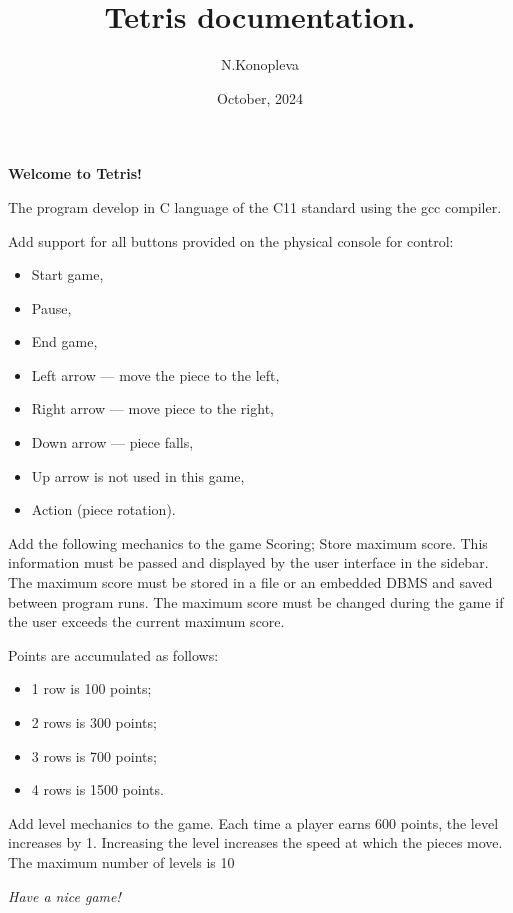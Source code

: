 \documentclass[12pt, letterpaper]{article}
\title{Tetris documentation.}
\author{N.Konopleva}
\date{October, 2024}
\begin{document}
\maketitle

\textbf{Welcome to Tetris!}

The program develop in C language of the C11 standard using the gcc compiler.


Add support for all buttons provided on the physical console for control: 
\begin{itemize}
    \item Start game,
    \item Pause,
    \item End game,
    \item Left arrow — move the piece to the left,
    \item Right arrow — move piece to the right,
    \item Down arrow — piece falls,
    \item Up arrow is not used in this game,
    \item Action (piece rotation).
\end{itemize}


Add the following mechanics to the game 
Scoring;
Store maximum score. 
This information must be passed and displayed by the user interface in the sidebar. The maximum score must be stored in a file or an embedded
DBMS and saved between program runs. 
The maximum score must be changed during the game if the user exceeds the current maximum score. 

Points are accumulated as follows: 

\begin{itemize}
    \item  1 row is 100 points;
    \item  2 rows is 300 points;
    \item  3 rows is 700 points;
    \item  4 rows is 1500 points. 
\end{itemize}

Add level mechanics to the game. Each time a player earns 600 points, the level increases by 1. Increasing the level increases the speed at which
the pieces move. The maximum number of levels is 10


\textit{Have a nice game!}
\end{document}
